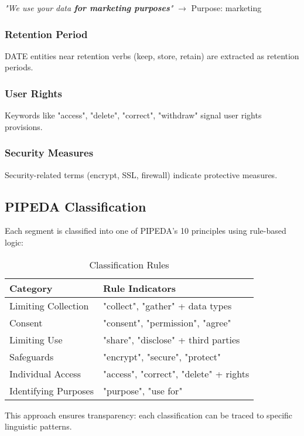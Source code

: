 \documentclass[conference]{IEEEtran}
\begin{document}
\textit{"We use your data \textbf{for marketing purposes}"} $\rightarrow$ Purpose: marketing

\subsubsection{Retention Period}
DATE entities near retention verbs (keep, store, retain) are extracted as retention periods.

\subsubsection{User Rights}
Keywords like "access", "delete", "correct", "withdraw" signal user rights provisions.

\subsubsection{Security Measures}
Security-related terms (encrypt, SSL, firewall) indicate protective measures.

\subsection{PIPEDA Classification}

Each segment is classified into one of PIPEDA's 10 principles using rule-based logic:

\begin{table}[htbp]
\caption{Classification Rules}
\begin{center}
\begin{tabular}{|p{2cm}|p{5cm}|}
\hline
\textbf{Category} & \textbf{Rule Indicators} \\
\hline
Limiting Collection & "collect", "gather" + data types \\
\hline
Consent & "consent", "permission", "agree" \\
\hline
Limiting Use & "share", "disclose" + third parties \\
\hline
Safeguards & "encrypt", "secure", "protect" \\
\hline
Individual Access & "access", "correct", "delete" + rights \\
\hline
Identifying Purposes & "purpose", "use for" \\
\hline
\end{tabular}
\label{tab:rules}
\end{center}
\end{table}

This approach ensures transparency: each classification can be traced to specific linguistic patterns.
\end{document}
